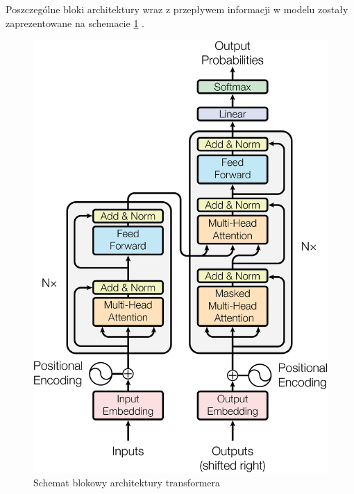 \documentclass[12pt,a4paper,twoside]{book} %
\begin{document}
Poszczególne bloki architektury wraz z przepływem informacji w modelu zostały zaprezentowane na schemacie \ref{fig:transformer_architecture} \cite{vaswani2023attentionneed}.

\begin{figure}[h]
    \centering
	\includegraphics[scale=0.20]{figs/architecture.png}
	\caption{Schemat blokowy architektury transformera}
	\label{fig:transformer_architecture}
\end{figure}



\end{document}
